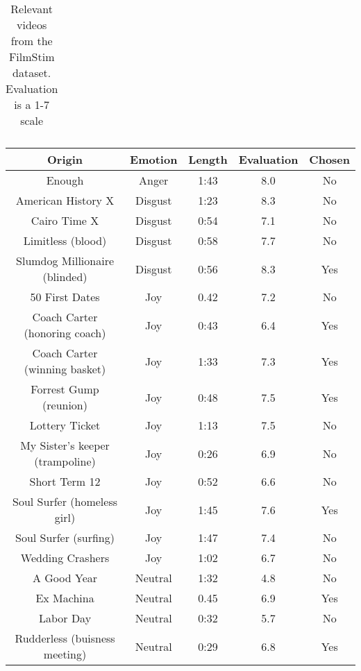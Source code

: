 \begin{table}[]
\begin{tabular}{|c|c|c|c|c|}
          
    \end{tabular}
    \caption{Relevant videos from the FilmStim dataset. Evaluation is a 1-7 scale \cite{FilmStim}}
    \label{tab:videos}
\end{table}


\begin{table}[]
    \centering
    \begin{tabular}{|c|c|c|c|c|}
        \hline
         Origin & Emotion & Length & Evaluation & Chosen  \\ \hline
          Enough & Anger & 1:43 & 8.0  & No \\ \hline
          American History X & Disgust & 1:23 & 8.3  & No \\ \hline
          Cairo Time X & Disgust & 0:54 & 7.1  & No \\ \hline
          Limitless (blood) & Disgust & 0:58 & 7.7  & No \\ \hline
          Slumdog Millionaire (blinded) & Disgust & 0:56 & 8.3  & Yes\\ \hline
          50 First Dates & Joy & 0.42 & 7.2  & No \\ \hline
          Coach Carter (honoring coach) & Joy & 0:43 & 6.4  & Yes \\ \hline
          Coach Carter (winning basket) & Joy & 1:33 & 7.3  & Yes \\ \hline
          Forrest Gump (reunion) & Joy & 0:48 & 7.5  & Yes \\ \hline
          Lottery Ticket & Joy & 1:13 & 7.5  & No \\ \hline
          My Sister's keeper (trampoline) & Joy & 0:26 & 6.9  & No \\ \hline
          Short Term 12 & Joy & 0:52 & 6.6  & No \\ \hline
          Soul Surfer (homeless girl) & Joy & 1:45 & 7.6  & Yes \\ \hline
          Soul Surfer (surfing) & Joy & 1:47 & 7.4  & No \\ \hline
          Wedding Crashers & Joy & 1:02 & 6.7  & No \\ \hline
          A Good Year & Neutral & 1:32 & 4.8  & No \\ \hline
          Ex Machina & Neutral & 0.45 & 6.9  & Yes \\ \hline
          Labor Day & Neutral & 0:32 & 5.7  & No \\ \hline
          Rudderless (buisness meeting) & Neutral & 0:29 & 6.8  & Yes \\ \hline

\end{tabular}
\end{table}
